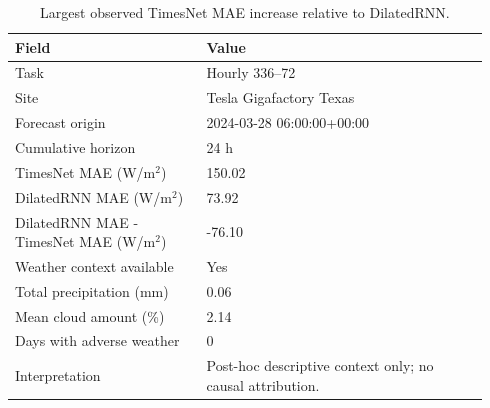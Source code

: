 \begin{table}[htbp]
\centering
\footnotesize
\caption{Largest observed TimesNet MAE increase relative to DilatedRNN.}
\label{tab:caso-maior-deficit-timesnet}
\begin{tabular}{@{}p{0.38\linewidth}p{0.56\linewidth}@{}}
\toprule
\textbf{Field} & \textbf{Value} \\
\midrule
Task & Hourly 336--72 \\
Site & Tesla Gigafactory Texas \\
Forecast origin & 2024-03-28 06:00:00+00:00 \\
Cumulative horizon & 24 h \\
TimesNet MAE (W/m$^2$) & 150.02 \\
DilatedRNN MAE (W/m$^2$) & 73.92 \\
DilatedRNN MAE - TimesNet MAE (W/m$^2$) & -76.10 \\
Weather context available & Yes \\
Total precipitation (mm) & 0.06 \\
Mean cloud amount (\%) & 2.14 \\
Days with adverse weather & 0 \\
Interpretation & Post-hoc descriptive context only; no causal attribution. \\
\bottomrule
\end{tabular}
\end{table}

